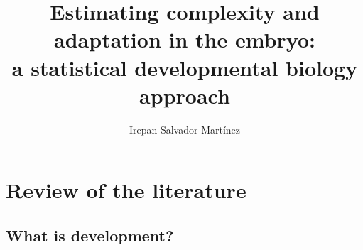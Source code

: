 \documentclass[officiallayout]{tktla_modified}
\title{\hfill\break \hfill\break   %
Estimating complexity and adaptation 
in the embryo:
\\ a statistical developmental biology approach
}
\author{Irepan Salvador-Mart\'inez}
\begin{document}
\frontmatter

\maketitle
\makenomenclature

\begin{acknowledgements}
  
\end{acknowledgements}

\renewcommand{\baselinestretch}{0.8}\normalsize
\tableofcontents
\renewcommand{\baselinestretch}{1.0}\normalsize

\mainmatter




\printnomenclature


	


\chapter{Review of the literature}




\section{What is development?}
	
	
\end{document}
